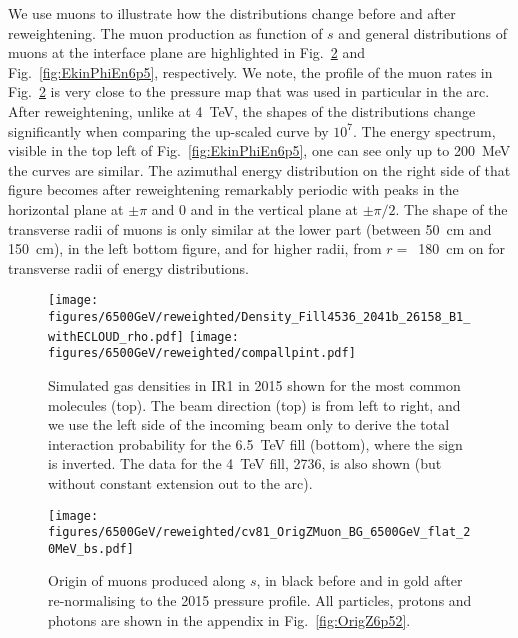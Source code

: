 We use muons to illustrate how the distributions change before and after reweightening. The muon production as function of $s$ and general distributions of muons at the interface plane are highlighted in Fig.~\ref{fig:OrigZ6p5} and Fig.~\ref{fig:EkinPhiEn6p5}, respectively. We note, the profile of the muon rates in Fig.~\ref{fig:OrigZ6p5} is very close to the pressure map that was used in particular in the arc. After reweightening, unlike at 4~TeV, the shapes of the distributions change significantly when comparing the up-scaled curve by $10^7$. The energy spectrum, visible in the top left of Fig.~\ref{fig:EkinPhiEn6p5}, one can see only up to 200~MeV the curves are similar. The azimuthal energy distribution on the right side of that figure becomes after reweightening remarkably periodic with peaks in the horizontal plane at $\pm \pi$ and $0$ and in the vertical plane at $\pm \pi/2$. The shape of the transverse radii of muons is only similar at the lower part (between 50~cm and 150~cm), in the left bottom figure, and for higher radii, from $r =$~180~cm on for transverse radii of energy distributions.

\begin{figure}
\begin{center}
  \texttt{[image: figures/6500GeV/reweighted/Density\_Fill4536\_2041b\_26158\_B1\_withECLOUD\_rho.pdf]}
  \texttt{[image: figures/6500GeV/reweighted/compallpint.pdf]}
\end{center}
\vspace{-0.6cm}
 \caption{Simulated gas densities in IR1 in 2015 shown for the most common molecules (top). The beam direction (top) is from left to right, and we use the left side of the incoming beam only to derive the total interaction probability for the 6.5~TeV fill (bottom), where the sign is inverted. The data for the 4~TeV fill, 2736, is also shown (but without constant extension out to the arc).
  \label{pressure2015}}
\end{figure}

\begin{figure}
\begin{center}
  \texttt{[image: figures/6500GeV/reweighted/cv81\_OrigZMuon\_BG\_6500GeV\_flat\_20MeV\_bs.pdf]}
\end{center}
\vspace{-0.6cm}
 \caption{Origin of muons produced along $s$, in black before and in gold after re-normalising to the 2015 pressure profile. All particles, protons and photons are shown in the appendix in Fig.~\ref{fig:OrigZ6p52}. 
  \label{fig:OrigZ6p5}}
\end{figure}

